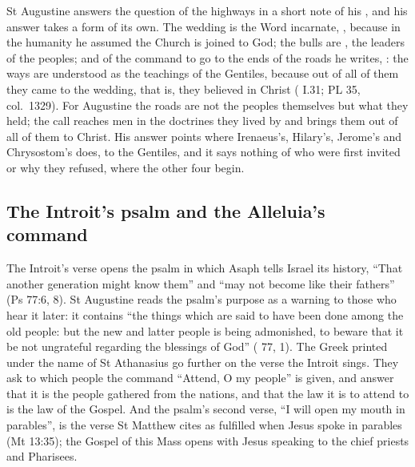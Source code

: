 St Augustine answers the question of the highways in a short note of his
, and his answer takes a form of its own. The
wedding is the Word incarnate, , because in the humanity he assumed the Church is joined to God;
the bulls are , the leaders of the peoples; and of the
command to go to the ends of the roads he writes, : the ways are understood as the teachings of the Gentiles, because
out of all of them they came to the wedding, that is, they believed in Christ
( I.31; PL 35, col.~1329). For Augustine the
roads are not the peoples themselves but what they held; the call reaches men
in the doctrines they lived by and brings them out of all of them to Christ.
His answer points where Irenaeus's, Hilary's, Jerome's and Chrysostom's does,
to the Gentiles, and it says nothing of who were first invited or why they
refused, where the other four begin.

\subsection{The Introit's psalm and the Alleluia's command}

The Introit's verse opens the psalm in which Asaph tells Israel its history,
``That another generation might know them'' and ``may not become like their
fathers'' (Ps 77:6, 8). St Augustine reads the psalm's purpose as a warning to
those who hear it later: it contains ``the things which are said to have been
done among the old people: but the new and latter people is being admonished,
to beware that it be not ungrateful regarding the blessings of God''
( 77, 1). The Greek  printed
under the name of St Athanasius go further on the verse the Introit sings. They
ask to which people the command ``Attend, O my people'' is given, and answer
that it is the people gathered from the nations, and that the law it is to
attend to is the law of the Gospel. And the psalm's second verse, ``I will open
my mouth in parables'', is the verse St Matthew cites as fulfilled when Jesus
spoke in parables (Mt 13:35); the Gospel of this Mass opens with Jesus speaking
 to the chief priests and Pharisees.

